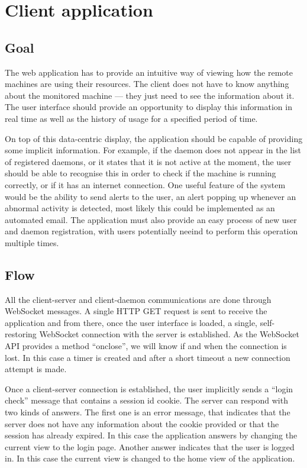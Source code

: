 \documentclass{l3proj}
\begin{document}
\section{Client application}

\subsection{Goal}

The web application has to provide an intuitive way of viewing how the remote machines are using their resources. The client does not have to know anything about the monitored machine --- they just need to see the information about it. The user interface should provide an opportunity to display this information in real time as well as the history of usage for a specified period of time.

On top of this data-centric display, the application should be capable of providing some implicit information. For example, if the daemon does not appear in the list of registered daemons, or it states that it is not active at the moment, the user should be able to recognise this in order to check if the machine is running correctly, or if it has an internet connection. One useful feature of the system would be the ability to send alerts to the user, an alert popping up whenever an abnormal activity is detected, most likely this could be implemented as an automated email. The application must also provide an easy process of new user and daemon registration, with users potentially neeind to perform this operation multiple times.


\subsection{Flow}

All the client-server and client-daemon communications are done through WebSocket messages. A single HTTP GET request is sent to receive the application and from there, once the user interface is loaded, a single, self-restoring WebSocket connection with the server is established. As the WebSocket API provides a method ``onclose'', we will know if and when the connection is lost. In this case a timer is created and after a short timeout a new connection attempt is made.

Once a client-server connection is established, the user implicitly sends a ``login check'' message that contains a session id cookie. The server can respond with two kinds of answers. The first one is an error message, that indicates that the server does not have any information about the cookie provided or that the session has already expired. In this case the application answers by changing the current view to the login page. Another answer indicates that the user is logged in. In this case the current view is changed to the home view of the application.
\end{document}
